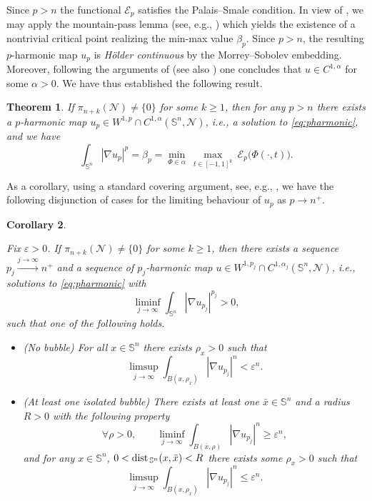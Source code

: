 \documentclass[12pt]{amsart}
\def\eps{\varepsilon}
\def\n{{\mathcal M}}
\def\n{{\mathcal{M}}}
\def\n{{\mathcal N}}
\def\S{{\mathbb S}}
\newtheorem{theorem}{Theorem}
\newtheorem{corollary}[theorem]{Corollary}
\def\dist{{\rm dist\,}}
\numberwithin{theorem}{section} \numberwithin{equation}{section}
\begin{document}
Since $p > n$ the functional $\mathcal{E}_p$ satisfies the Palais--Smale condition. In view of , we may apply the mountain-pass lemma (see, e.g., \cite[Theorem 6.1]{StruweVariationalMethods}) which yields the existence of a nontrivial critical point  realizing the min-max value $\beta_p$.
Since $p>n$, the resulting $p$-harmonic map $u_p$ is \emph{H\"{o}lder continuous} by the Morrey--Sobolev embedding. Moreover, following the arguments of \cite[Section 3]{HLp} (see also \cite[Theorem 1.3]{M2025}) one concludes that $u \in C^{1,\alpha}$ for some $\alpha > 0$.
We have thus established the following result.
\begin{theorem}\label{th:minmaxpharmmaps}
If $\pi_{n+k}(\n) \neq \{0\}$ for some $k \geq 1$, then for any $p > n$ there exists a $p$-harmonic map $u_p\in W^{1,p}\cap C^{1,\alpha}(\S^n,\n)$, i.e., a solution to \eqref{eq:pharmonic}, and we have
\[
 \int_{\S^n} |\nabla u_p|^p =\beta_p=\min_{\Phi \in \alpha}\ \max_{t \in [-1,1]^k}\ \mathcal{E}_p\big(\Phi(\cdot,t)\big).
\]
\end{theorem}
% 
As a corollary, using a standard covering argument, see, e.g., \cite[Proposition 4.3 and Theorem 4.4]{SacksU81},  we have the following disjunction of cases for the limiting behaviour of $u_p$ as $p\to n^+$.
\begin{corollary}\label{co:minmaxpharmmaps}

Fix $\eps > 0$. If $\pi_{n+k}(\n) \neq \{0\}$ for some $k \geq 1$, then there exists a sequence  $p_j \xrightarrow{j \to\infty} n^+$ and a sequence of $p_j$-harmonic map $u\in W^{1,p_j}\cap C^{1,\alpha_j}(\S^n,\n)$, i.e., solutions to \eqref{eq:pharmonic} with
\[
 \liminf_{j \to \infty} \int_{\S^n} |\nabla u_{p_j}|^{p_j} > 0,
\]
such that one of the following holds.
\begin{itemize} 
 \item (No bubble) For all $x \in \S^{n}$ there exists $\rho_x > 0$ such that 
 \[
  \limsup_{j \to \infty} \int_{B(x,\rho_x)} |\nabla u_{p_j}|^{n} < \eps^n.
 \]
\item (At least one isolated bubble) There exists at least one $\bar{x} \in \S^n$ and a radius $R > 0$ with the following property
 \[
  \forall \rho > 0,\qquad \liminf_{j \to \infty} \int_{B(\bar{x},\rho)} |\nabla u_{p_j}|^{n} \geq \eps^n, 
 \]
and for any $x \in \S^n$, $0<\dist_{\S^n}(x,\bar{x})<R$ there exists some $\rho_x > 0$ such that 
\[
  \limsup_{j \to \infty} \int_{B(x,\rho_x)} |\nabla u_{p_j}|^{n} \leq \eps^n.
\]
\end{itemize}
\end{corollary}
\end{document}
